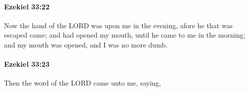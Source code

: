		\paragraph{Ezekiel 33:22} %
			\label{EZEKIEL-33-22}

			Now the hand of the LORD was upon me in the evening, afore he that was escaped came; and had opened my mouth, until he came to me in the morning; and my mouth was opened, and I was no more dumb.


		\paragraph{Ezekiel 33:23} %
			\label{EZEKIEL-33-23}

			Then the word of the LORD came unto me, saying,



